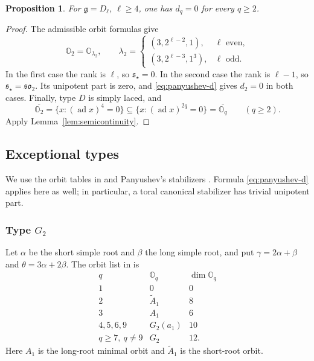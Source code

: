 \documentclass[11pt]{amsart}
\newtheorem{proposition}[theorem]{Proposition}
\theoremstyle{definition}
\theoremstyle{remark}
\newcommand{\g}{\mathfrak g}
\newcommand{\soalg}{\mathfrak{so}}
\DeclareMathOperator{\ad}{ad}
\begin{document}
\begin{proposition}\label{prop:typeD}
For $\g=D_\ell$, $\ell\ge4$, one has $d_q=0$ for every $q\ge2$.
\end{proposition}
\begin{proof}
The admissible orbit formulas \cite{ArAssoc,AvEM} give
\[
 \mathbb O_2=\mathbb O_{\lambda_2},\qquad
 \lambda_2=\begin{cases}
 (3,2^{\ell-2},1),&\ell\text{ even},\\
 (3,2^{\ell-3},1^3),&\ell\text{ odd}.
 \end{cases}
\]
In the first case the rank is $\ell$, so
$\mathfrak s_\star=0$. In the second case the rank is $\ell-1$,
so $\mathfrak s_\star=\soalg_2$. Its unipotent part is zero,
and \eqref{eq:panyushev-d} gives $d_2=0$ in both cases.
Finally, type $D$ is simply laced, and
\[
 \overline{\mathbb O_2}=\{x:(\ad x)^4=0\}
 \subseteq\{x:(\ad x)^{2q}=0\}=\overline{\mathbb O_q}
 \qquad(q\ge2).
\]
Apply Lemma~\ref{lem:semicontinuity}.
\end{proof}

\subsection{Exceptional types}
We use the orbit tables in \cite{AvEM} and Panyushev's stabilizers
\cite[Section~2.1 and Theorem~6.1]{Pan}. Formula
\eqref{eq:panyushev-d} applies here as well; in particular, a toral
canonical stabilizer has trivial unipotent part.

\subsubsection{Type \texorpdfstring{$G_2$}{G2}}\label{subsec:g2}

Let $\alpha$ be the short simple root and $\beta$ the long simple
root, and put $\gamma=2\alpha+\beta$ and $\theta=3\alpha+2\beta$.
The orbit list in \cite[Tables~1--2]{AvEM} is
\begin{equation}\label{eq:g2-orbit-table}
\begin{array}{c|c|c}
q&\mathbb O_q&\dim\mathbb O_q\\\hline
1&0&0\\
2&\widetilde A_1&8\\
3&A_1&6\\
4,5,6,9&G_2(a_1)&10\\
q\ge7,\ q\ne9&G_2&12.
\end{array}
\end{equation}
Here $A_1$ is the long-root minimal orbit and $\widetilde A_1$
is the short-root orbit.
\end{document}
